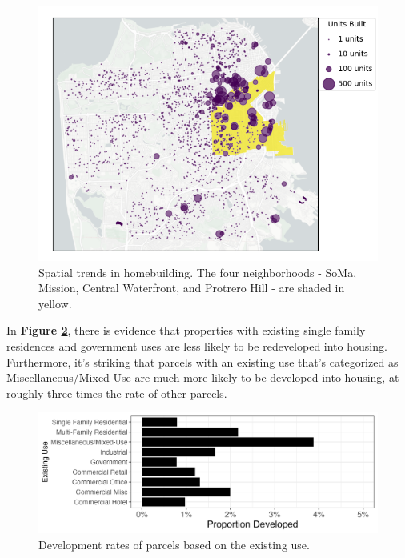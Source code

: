 \documentclass[a4paper,12pt]{article}
\begin{document}
\begin{figure}[hbt]
    \centering
    \includegraphics[scale=.75]{./rdd/figures/where_housing_gets_built2014.png}
    \caption{Spatial trends in homebuilding. The four neighborhoods - SoMa, Mission, Central Waterfront, and Protrero Hill - are shaded in yellow.}
    \label{fig:eda_spatial_trend}
\end{figure}

In \textbf{Figure \ref{fig:eda_barplots}}, there is evidence that properties with existing single family residences and government uses are less likely to be redeveloped into housing. Furthermore, it's striking that parcels with an existing use that's categorized as Miscellaneous/Mixed-Use are much more likely to be developed into housing, at roughly three times the rate of other parcels. 

\begin{figure}[hbtp]
    \centering
    \includegraphics[scale=.85]{./figures/eda_barplots.png}
    \caption{Development rates of parcels based on the existing use.}
    \label{fig:eda_barplots}
\end{figure}
\end{document}
